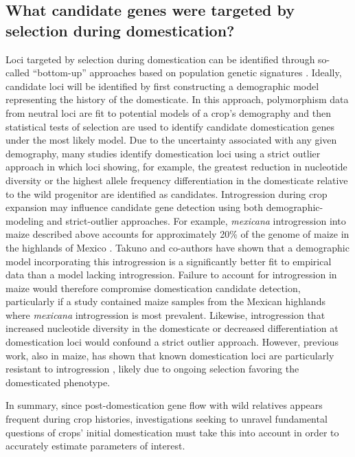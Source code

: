 \documentclass[11pt]{article}
\begin{document}
\subsection*{What candidate genes were targeted by selection during domestication?}
Loci targeted by selection during domestication can be identified through so-called ``bottom-up'' approaches based on population genetic signatures \cite{Ross-Ibarra2007}.
Ideally, candidate loci will be identified by first constructing a demographic model representing the history of the domesticate.
In this approach, polymorphism data from neutral loci are fit to potential models of a crop's demography and then statistical tests of selection are used to identify candidate domestication genes under the most likely model.
Due to the uncertainty associated with any given demography, many studies identify domestication loci using a strict outlier approach in which loci showing, for example, the greatest reduction in nucleotide diversity or the highest allele frequency differentiation in the domesticate relative to the wild progenitor are identified as candidates.
Introgression during crop expansion may influence candidate gene detection using both demographic-modeling and strict-outlier approaches.
For example, \emph{mexicana} introgression into maize described above accounts for approximately 20\% of the genome of maize in the highlands of Mexico \cite{vanHeerwaarden2011}.
Takuno and co-authors \cite{Takuno2015} have shown that a demographic model incorporating this introgression is a significantly better fit to empirical data than a model lacking introgression.
Failure to account for introgression in maize would therefore compromise domestication candidate detection, particularly if a study contained maize samples from the Mexican highlands where \emph{mexicana} introgression is most prevalent.
Likewise, introgression that increased nucleotide diversity in the domesticate or decreased differentiation at domestication loci would confound a strict outlier approach.
However, previous work, also in maize, has shown that known domestication loci are particularly resistant to introgression \cite{Hufford2013}, likely due to ongoing selection favoring the domesticated phenotype.
\vspace{5mm}

In summary, since post-domestication gene flow with wild relatives appears frequent during crop histories, investigations seeking to unravel fundamental questions of crops' initial domestication must take this into account in order to accurately estimate parameters of interest.
\end{document}
